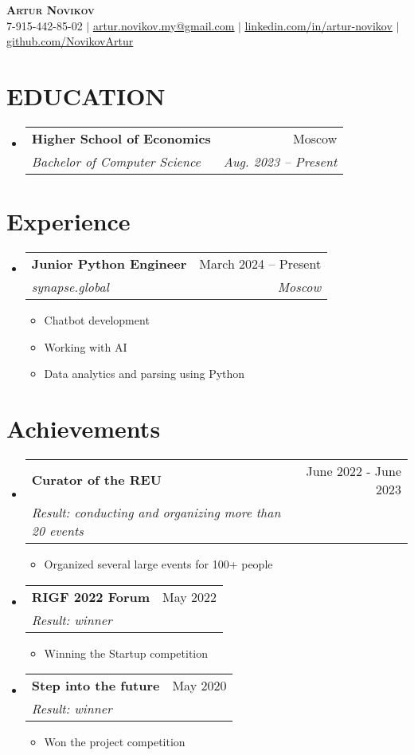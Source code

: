 \documentclass[letterpaper,11pt]{article}
\makeatletter
\newcommand{\resumeItem}[1]{
  \item\small{
    {#1 \vspace{-2pt}}
  }
}
\newcommand{\resumeSubheading}[4]{
  \vspace{-2pt}\item
    \begin{tabular*}{0.97\textwidth}[t]{l@{\extracolsep{\fill}}r}
      \textbf{#1} & #2 \\
      \textit{\small#3} & \textit{\small #4} \\
    \end{tabular*}\vspace{-7pt}
}
\newcommand{\resumeSubHeadingListStart}{\begin{itemize}[leftmargin=0.15in, label={}]}
\newcommand{\resumeSubHeadingListEnd}{\end{itemize}}
\newcommand{\resumeItemListStart}{\begin{itemize}}
\newcommand{\resumeItemListEnd}{\end{itemize}\vspace{-5pt}}
\makeatother
\begin{document}
\begin{center}
    \textbf{\Huge \scshape Artur Novikov} \\ \vspace{1pt}
    \small 7-915-442-85-02 $|$ \href{mailto:x@x.com}{\underline{artur.novikov.my@gmail.com}} $|$ 
    \href{https://www.linkedin.com/in/artur-novikov/}{\underline{linkedin.com/in/artur-novikov}} $|$
    \href{https://github.com/NovikovArtur}{\underline{github.com/NovikovArtur}}
\end{center}


\section{EDUCATION}
  \resumeSubHeadingListStart
    \resumeSubheading
      {Higher School of Economics}{Moscow}
      {Bachelor of Computer Science}{Aug. 2023 -- Present}
  \resumeSubHeadingListEnd


\section{Experience}
  \resumeSubHeadingListStart
    \resumeSubheading
      {Junior Python Engineer}{March 2024 -- Present}
      {synapse.global}{Moscow}
      \resumeItemListStart
        \resumeItem{Chatbot development}
        \resumeItem{Working with AI}
        \resumeItem{Data analytics and parsing using Python}
      \resumeItemListEnd
  \resumeSubHeadingListEnd


\section{Achievements}
  \resumeSubHeadingListStart
    \resumeSubheading
      {Curator of the REU}{June 2022 - June 2023}
      {Result: conducting and organizing more than 20 events}{}
      \resumeItemListStart
        \resumeItem{Organized several large events for 100+ people}
        \resumeItemListEnd
  \resumeSubHeadingListEnd
  \resumeSubHeadingListStart
    \resumeSubheading
      {RIGF 2022 Forum}{May 2022}
      {Result: winner}{}
      \resumeItemListStart
        \resumeItem{Winning the Startup competition}
        \resumeItemListEnd
  \resumeSubHeadingListEnd
  \resumeSubHeadingListStart
    \resumeSubheading
      {Step into the future}{May 2020}
      {Result: winner}{}
      \resumeItemListStart
        \resumeItem{Won the project competition}
        \resumeItemListEnd
  \resumeSubHeadingListEnd
  
\end{document}
